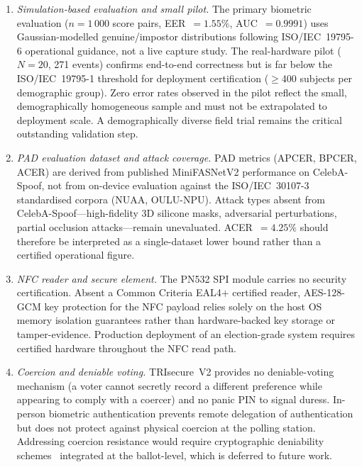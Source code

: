 \documentclass[pdflatex,sn-vancouver-num]{sn-jnl}%
\theoremstyle{thmstyleone}%
\theoremstyle{thmstyletwo}%
\theoremstyle{thmstylethree}%
\begin{document}
\begin{enumerate}

  \item \textit{Simulation-based evaluation and small pilot.}
    The primary biometric evaluation (\(n{=}1\,000\) score pairs,
    EER~\(=1.55\%\), AUC~\(=0.9991\)) uses Gaussian-modelled
    genuine/impostor distributions following ISO/IEC~19795-6 operational
    guidance, not a live capture study. The real-hardware pilot (\(N{=}20\),
    271 events) confirms end-to-end correctness but is far below the
    ISO/IEC~19795-1 threshold for deployment certification
    (\(\geq\)400 subjects per demographic group). Zero error rates observed
    in the pilot reflect the small, demographically homogeneous sample and
    must not be extrapolated to deployment scale. A demographically diverse
    field trial remains the critical outstanding validation step.

  \item \textit{PAD evaluation dataset and attack coverage.}
    PAD metrics (APCER, BPCER, ACER) are derived from published
    MiniFASNetV2 performance on CelebA-Spoof, not from on-device evaluation
    against the ISO/IEC~30107-3 standardised corpora (NUAA, OULU-NPU).
    Attack types absent from CelebA-Spoof---high-fidelity 3D silicone masks,
    adversarial perturbations, partial occlusion attacks---remain
    unevaluated. ACER~\(=4.25\%\) should therefore be interpreted as a
    single-dataset lower bound rather than a certified operational figure.

  \item \textit{NFC reader and secure element.}
    The PN532 SPI module carries no security certification. Absent a
    Common Criteria EAL4\(+\) certified reader, AES-128-GCM key protection
    for the NFC payload relies solely on the host OS memory isolation
    guarantees rather than hardware-backed key storage or tamper-evidence.
    Production deployment of an election-grade system requires certified
    hardware throughout the NFC read path.

  \item \textit{Coercion and deniable voting.}
    TRIsecure~V2 provides no deniable-voting mechanism (a voter cannot
    secretly record a different preference while appearing to comply with
    a coercer) and no panic PIN to signal duress. In-person biometric
    authentication prevents remote delegation of authentication but does
    not protect against physical coercion at the polling station.
    Addressing coercion resistance would require cryptographic deniability
    schemes~\cite{juels2005coercion,clarkson2008civitas} integrated at the ballot-level, which
    is deferred to future work.


\end{enumerate}
\end{document}
